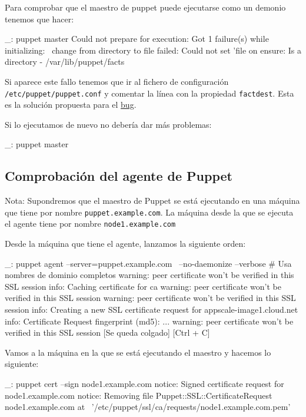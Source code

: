 Para comprobar que el maestro de puppet puede ejecutarse como un demonio tenemos que hacer:

\begin{bashcode}
_: puppet master
Could not prepare for execution: Got 1 failure(s) while initializing: \
change from directory to file failed: 
Could not set 'file on ensure: Is a directory - /var/lib/puppet/facts
\end{bashcode}

Si aparece este fallo tenemos que ir al fichero de configuración \texttt{/etc/puppet/puppet.conf} y comentar la línea con la propiedad \texttt{factdest}. Esta es la solución propuesta para el \href{https://projects.puppetlabs.com/issues/9491}{bug}.

Si lo ejecutamos de nuevo no debería dar más problemas:

\begin{bashcode}
_: puppet master
\end{bashcode}


\subsection{Comprobación del agente de Puppet}

Nota: Supondremos que el maestro de Puppet se está ejecutando en una máquina que tiene por nombre \texttt{puppet.example.com}. La máquina desde la que se ejecuta el agente tiene por nombre \texttt{node1.example.com}

Desde la máquina que tiene el agente, lanzamos la siguiente orden:

\begin{bashcode}
_: puppet agent --server=puppet.example.com \
--no-daemonize --verbose   # Usa nombres de dominio completos
warning: peer certificate won't be verified in this SSL session
info: Caching certificate for ca
warning: peer certificate won't be verified in this SSL session
warning: peer certificate won't be verified in this SSL session
info: Creating a new SSL certificate request for appscale-image1.cloud.net
info: Certificate Request fingerprint (md5): ... 
warning: peer certificate won't be verified in this SSL session
[Se queda colgado]
[Ctrl + C]
\end{bashcode}

Vamos a la máquina en la que se está ejecutando el maestro y hacemos lo siguiente:

\begin{bashcode}
_: puppet cert --sign node1.example.com
notice: Signed certificate request for node1.example.com
notice: Removing file Puppet::SSL::CertificateRequest node1.example.com at \
'/etc/puppet/ssl/ca/requests/node1.example.com.pem'
\end{bashcode}

